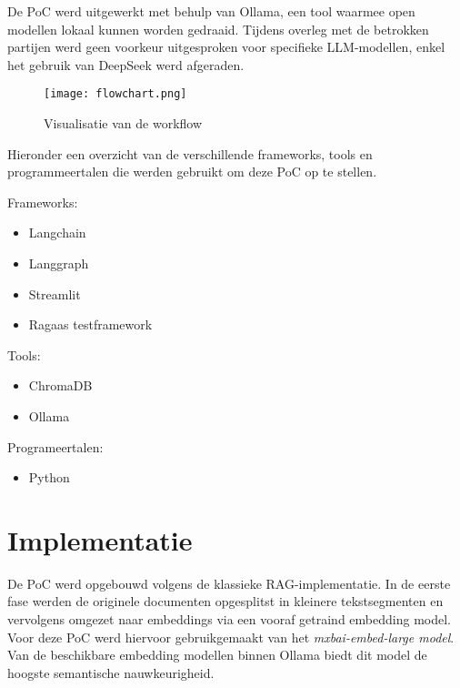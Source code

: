 De PoC werd uitgewerkt met behulp van Ollama, een tool waarmee open modellen lokaal kunnen worden gedraaid. Tijdens overleg met de betrokken partijen werd geen voorkeur uitgesproken voor specifieke LLM-modellen, enkel het gebruik van DeepSeek werd afgeraden.

\begin{figure}[H]
    \texttt{[image: flowchart.png]}
    \caption{Visualisatie van de workflow}
    \label{fig:flowchart}
\end{figure}


Hieronder een overzicht van de verschillende frameworks, tools en programmeertalen die werden gebruikt om deze PoC op te stellen.

Frameworks:
\begin{itemize}
    \item Langchain
    \item Langgraph
    \item Streamlit
    \item Ragaas testframework
\end{itemize}

Tools:
\begin{itemize}
    \item ChromaDB
    \item Ollama
\end{itemize}

Programeertalen:
\begin{itemize}
    \item Python
\end{itemize}


\section{Implementatie}


De PoC werd opgebouwd volgens de klassieke RAG-implementatie. In de eerste fase werden de originele documenten opgesplitst in kleinere tekstsegmenten en vervolgens omgezet naar embeddings via een vooraf getraind embedding model. Voor deze PoC werd hiervoor gebruikgemaakt van het \textit{mxbai-embed-large model}. Van de beschikbare embedding modellen binnen Ollama biedt dit model de hoogste semantische nauwkeurigheid.

